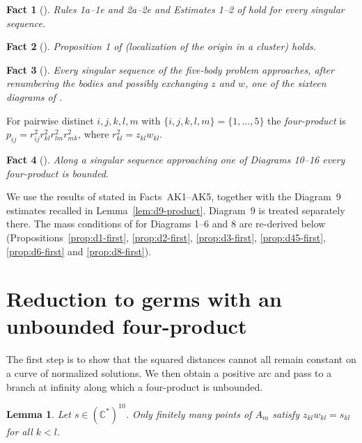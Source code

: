\documentclass[11pt]{amsart}
\newtheorem{lemma}[theorem]{Lemma}
\newtheorem{fact}{Fact}
\theoremstyle{definition}
\theoremstyle{remark}
\newcommand{\C}{\mathbb{C}}
\begin{document}
\begin{fact}[{\cite[\S3]{AK}}]\label{fact:rules}
Rules 1a--1e and 2a--2e and Estimates 1--2 of \cite[\S3]{AK} hold for every singular sequence.
\end{fact}

\begin{fact}[{\cite[Prop.~1]{AK}}]\label{fact:prop1}
Proposition 1 of \cite{AK} (localization of the origin in a cluster) holds.
\end{fact}

\begin{fact}[{\cite[\S7]{AK}}]\label{fact:fig11}
Every singular sequence of the five-body problem approaches, after renumbering the bodies and
possibly exchanging $z$ and $w$, one of the sixteen diagrams of \cite[Fig.~11]{AK}.
\end{fact}

For pairwise distinct $i,j,k,l,m$ with $\{i,j,k,l,m\}=\{1,\dots,5\}$ the \emph{four-product} is
$p_{ij}=r_{ij}^2r_{kl}^2r_{lm}^2r_{mk}^2$, where $r_{kl}^2=z_{kl}w_{kl}$.

\begin{fact}[{\cite[Prop.~8]{AK}}]\label{fact:prop8}
Along a singular sequence approaching one of Diagrams 10--16 every four-product is bounded.
\end{fact}

We use the results of \cite{AK} stated in Facts~AK1--AK5, together with the Diagram~9
estimates recalled in Lemma~\ref{lem:d9-product}.  Diagram~9 is treated separately there.
The mass conditions of
\cite[\S8]{AK} for Diagrams 1--6 and 8 are re-derived below
(Propositions~\ref{prop:d1-first}, \ref{prop:d2-first}, \ref{prop:d3-first},
\ref{prop:d45-first}, \ref{prop:d6-first} and \ref{prop:d8-first}).


\section{Reduction to germs with an unbounded four-product}\label{sec:reduction}

The first step is to show that the squared distances cannot all remain constant on a
curve of normalized solutions.  We then obtain a positive arc and pass to a branch at
infinity along which a four-product is unbounded.

\begin{lemma}\label{lem:distances}
Let $s\in(\C^*)^{10}$.  Only finitely many points of $A_m$ satisfy $z_{kl}w_{kl}=s_{kl}$ for all
$k<l$.
\end{lemma}
\end{document}
